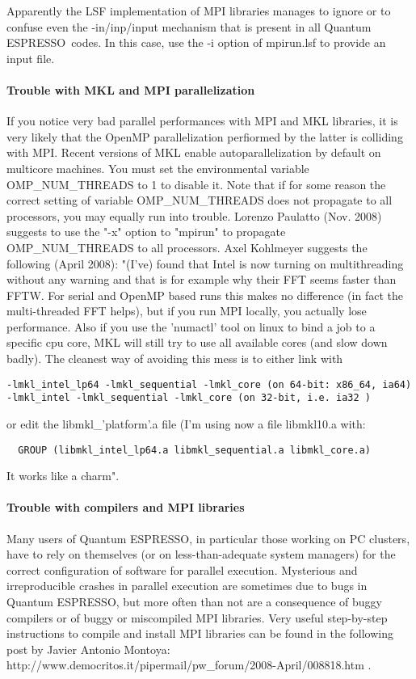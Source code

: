 \documentclass[12pt,a4paper]{article}
\def\qe{{\sc Quantum ESPRESSO}}
\begin{document}
Apparently the LSF implementation of MPI libraries manages to ignore or to
confuse even the -in/inp/input mechanism that is present in all
\qe\ codes. In this case, use the -i option of mpirun.lsf
to provide an input file.

\paragraph{Trouble with MKL and MPI parallelization}
If you notice very bad parallel performances with MPI and MKL libraries, 
it is very likely that the OpenMP parallelization perfiormed by the latter 
is colliding with MPI. Recent versions of MKL enable autoparallelization
by default on multicore machines.  You must set the environmental variable
OMP\_NUM\_THREADS to 1 to disable it. 
Note that if for some reason the correct setting  of variable
OMP\_NUM\_THREADS  
does not propagate to all processors, you may equally run into trouble. 
Lorenzo Paulatto (Nov. 2008) suggests to use the "-x" option to "mpirun" to 
propagate OMP\_NUM\_THREADS to all processors.
Axel Kohlmeyer suggests the following (April 2008): 
"(I've) found that Intel is now turning on multithreading without any
warning and that is for example why their FFT seems faster than
FFTW. For serial and OpenMP based runs this makes no difference (in
fact the multi-threaded FFT helps), but if you run MPI locally, you
actually lose performance. Also if you use the 'numactl' tool on linux
to bind a job to a specific cpu core, MKL will still try to use all
available cores (and slow down badly). The cleanest way of avoiding
this mess is to either link with
\begin{verbatim}
-lmkl_intel_lp64 -lmkl_sequential -lmkl_core (on 64-bit: x86_64, ia64)
-lmkl_intel -lmkl_sequential -lmkl_core (on 32-bit, i.e. ia32 )
\end{verbatim}
or edit the libmkl\_'platform'.a file (I'm using now a file libmkl10.a with:
\begin{verbatim}
  GROUP (libmkl_intel_lp64.a libmkl_sequential.a libmkl_core.a)
\end{verbatim}
It works like a charm".

\paragraph{Trouble with compilers and MPI libraries}
Many users of \qe, in particular those working on PC clusters,
have to rely on themselves (or on less-than-adequate system managers) for 
the correct configuration of software for parallel execution. Mysterious and
irreproducible crashes in parallel execution are sometimes due to bugs
in \qe, but more often than not are a consequence of buggy
compilers or of buggy or miscompiled MPI libraries. Very useful step-by-step 
instructions to compile and install MPI libraries
can be found in the following post by Javier Antonio Montoya:\\
http://www.democritos.it/pipermail/pw\_forum/2008-April/008818.htm .
\end{document}
